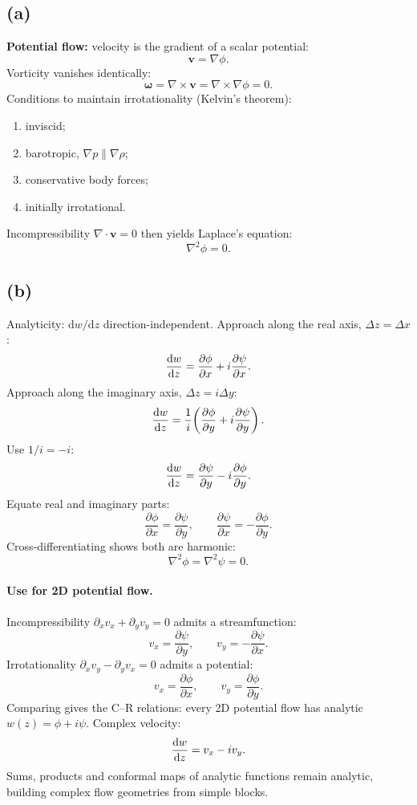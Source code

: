\documentclass[11pt]{article}
\newcommand{\de}{\mathrm{d}}
\newcommand{\pd}[2]{\frac{\partial #1}{\partial #2}}
\begin{document}
\subsection*{(a)}

\textbf{Potential flow:} velocity is the gradient of a scalar potential:
\[ \bm v = \nabla\phi. \]
Vorticity vanishes identically:
\[ \bm\omega = \nabla\times\bm v = \nabla\times\nabla\phi = 0. \]
Conditions to maintain irrotationality (Kelvin's theorem):
\begin{enumerate}\itemsep0pt
\item[(i)] inviscid;
\item[(ii)] barotropic, $\nabla p\parallel\nabla\rho$;
\item[(iii)] conservative body forces;
\item[(iv)] initially irrotational.
\end{enumerate}
Incompressibility $\nabla\cdot\bm v=0$ then yields Laplace's equation:
\[ \boxed{\;\nabla^{2}\phi = 0.\;} \]

\subsection*{(b)}

Analyticity: $\de w/\de z$ direction-independent. Approach along the real axis, $\Delta z=\Delta x$:
\[ \dv{w}{z} = \pd{\phi}{x} + i\pd{\psi}{x}. \]
Approach along the imaginary axis, $\Delta z=i\Delta y$:
\[ \dv{w}{z} = \frac{1}{i}\!\left(\pd{\phi}{y} + i\pd{\psi}{y}\right). \]
Use $1/i = -i$:
\[ \dv{w}{z} = \pd{\psi}{y} - i\pd{\phi}{y}. \]
Equate real and imaginary parts:
\[ \boxed{\;\pd{\phi}{x} = \pd{\psi}{y},\qquad \pd{\psi}{x} = -\pd{\phi}{y}.\;} \]
Cross-differentiating shows both are harmonic:
\[ \nabla^{2}\phi = \nabla^{2}\psi = 0. \]

\paragraph{Use for 2D potential flow.} Incompressibility $\partial_{x}v_{x}+\partial_{y}v_{y}=0$ admits a streamfunction:
\[ v_{x} = \pd{\psi}{y},\qquad v_{y} = -\pd{\psi}{x}. \]
Irrotationality $\partial_{x}v_{y}-\partial_{y}v_{x}=0$ admits a potential:
\[ v_{x} = \pd{\phi}{x},\qquad v_{y} = \pd{\phi}{y}. \]
Comparing gives the C--R relations: every 2D potential flow has analytic $w(z)=\phi+i\psi$. Complex velocity:
\[ \dv{w}{z} = v_{x} - iv_{y}. \]
Sums, products and conformal maps of analytic functions remain analytic, building complex flow geometries from simple blocks.
\end{document}

